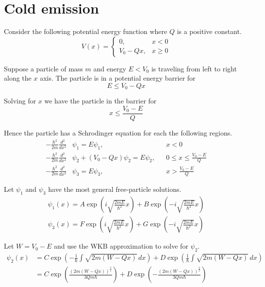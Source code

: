 

\section*{Cold emission}

Consider the following potential energy function where $Q$ is a positive constant.
\begin{equation*}
V(x)=
\begin{cases}
0, & x<0
\\
V_0-Qx, & x\ge0
\end{cases}
\end{equation*}

Suppose a particle of mass $m$ and energy $E<V_0$ is traveling from left to right
along the $x$ axis.
The particle is in a potential energy barrier for
\begin{equation*}
E\le V_0-Qx
\end{equation*}

Solving for $x$ we have the particle in the barrier for
\begin{equation*}
x\le\frac{V_0-E}{Q}
\end{equation*}

Hence the particle has a Schrodinger equation for each the following regions.
\begin{align*}
-\frac{\hbar^2}{2m}\frac{d^2}{dx^2}&\psi_1=E\psi_1, & &x<0
\\
-\frac{\hbar^2}{2m}\frac{d^2}{dx^2}&\psi_2+(V_0-Qx)\psi_2=E\psi_2, & &0\le x\le\frac{V_0-E}{Q}
\\
-\frac{\hbar^2}{2m}\frac{d^2}{dx^2}&\psi_3=E\psi_3, & &x>\frac{V_0-E}{Q}
\end{align*}

Let $\psi_1$ and $\psi_3$ have the most general
free-particle solutions.
\begin{align*}
\psi_1(x)=A\exp\left(i\sqrt{\frac{2mE}{\hbar^2}}x\right)
+B\exp\left(-i\sqrt{\frac{2mE}{\hbar^2}}x\right)
\\
\psi_3(x)=F\exp\left(i\sqrt{\frac{2mE}{\hbar^2}}x\right)
+G\exp\left(-i\sqrt{\frac{2mE}{\hbar^2}}x\right)
\end{align*}

Let $W=V_0-E$ and use the WKB approximation to solve for $\psi_2$.
\begin{align*}
\psi_2(x)&=
C\exp\left(-\frac{1}{\hbar}\int\sqrt{2m(W-Qx)}\,dx\right)
+D\exp\left(\frac{1}{\hbar}\int\sqrt{2m(W-Qx)}\,dx\right)
\\
{}&=C\exp\left(\frac{\left(2m(W-Qx)\right)^\frac{3}{2}}{3Qm\hbar}\right)
+D\exp\left(-\frac{\left(2m(W-Qx)\right)^\frac{3}{2}}{3Qm\hbar}\right)
\end{align*}

